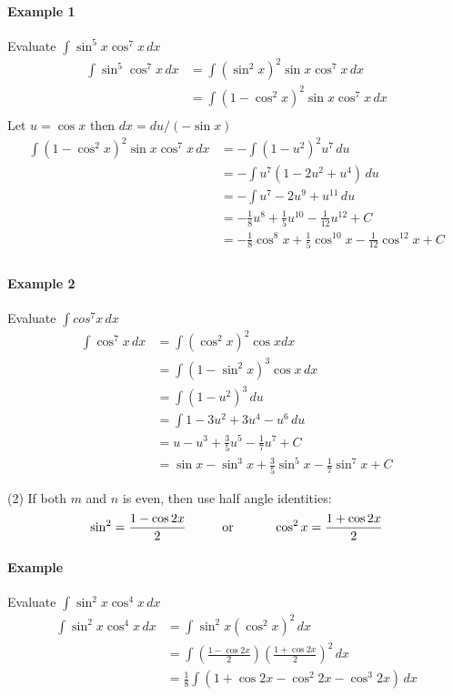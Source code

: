 \documentclass[12pt]{article}
\newcommand\tab[1][1cm]{\hspace*{#1}}
\begin{document}
\paragraph{Example 1} Evaluate $\int \sin^5 x \cos^7 x \, dx$
\begin{align*} 
    \int \sin^5 \cos^7 x \, dx &= \int (\sin^2 x)^2 \sin x \cos^7 x \, dx \\
    &= \int (1 -\cos^2 x)^2 \sin x \cos^7 x \, dx \\
\end{align*}
Let $u = \cos x$ then $dx = du/(-\sin x)$
\begin{align*} 
    \int (1 -\cos^2 x)^2 \sin x \cos^7 x \, dx &= - \int (1 - u^2)^2 u^7 \, du \\
    &= -\int u^7 (1 - 2u^2 + u^4) \, du \\
    &= - \int u^7 - 2u^9 + u^{11} \, du \\
    &= - \frac{1}{8}u^8 + \frac{1}{5} u^{10} - \frac{1}{12} u^{12} + C \\
    &= - \frac{1}{8} \cos^8 x + \frac{1}{5} \cos^{10} x - \frac{1}{12} \cos^{12} x + C \\
\end{align*}
\paragraph{Example 2} Evaluate $\int cos^7 x \, dx $
\begin{align*} 
    \int \cos^7 x \, dx &= \int (\cos^2x)^2 \cos x dx \\
    &= \int (1 - \sin^2x)^3 \cos x \, dx \\
    &= \int (1 - u^2)^3 \, du \\
    &= \int 1 - 3u^2 + 3u^4 - u^6 \, du \\
    &= u - u^3 + \frac{3}{5} u^5 - \frac{1}{7} u^7 + C \\
    &= \sin x - \sin^3 x + \frac{3}{5} \sin^5 x - \frac{1}{7} \sin^7 x + C
\end{align*}

\noindent
(2) If both $m$ and $n$ is even, then use half angle identities:
\[
    \sin^2 = \frac{1 - \cos 2x}{2} \textrm{\tab or \tab} \cos^2 x = \frac{1 + \cos 2x}{2} 
\]

\paragraph{Example} Evaluate $\int \sin^2 x \cos^4 x \, dx$
\begin{align*} 
    \int \sin^2 x \cos^4 x \, dx &= \int \sin^2 x(\cos^2 x)^2 \, dx \\
    &= \int \left( \frac{1 - \cos 2x}{2}  \right) \left( \frac{1 + \cos 2x}{2} \right)^2 \, dx \\
    &= \frac{1}{8} \int (1 + \cos 2x - \cos^2 2x - \cos^3 2x) \, dx \\
\end{align*}
\end{document}
